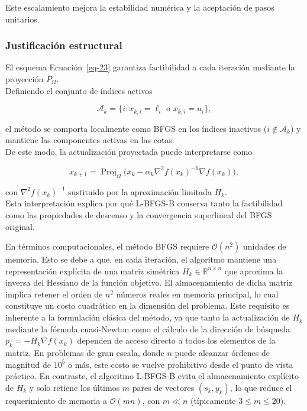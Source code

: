 \documentclass[
  spanish,
  us-letterpaper,
]{scrreprt}
\numberwithin{equation}{section}
\begin{document}
Este escalamiento mejora la estabilidad numérica y la aceptación de
pasos unitarios.

\subsubsection{Justificación
estructural}\label{justificaciuxf3n-estructural}

El esquema Ecuación~\ref{eq-23} garantiza factibilidad a cada iteración
mediante la proyección \(P_\Omega\).\\
Definiendo el conjunto de índices activos

\[
\mathcal{A}_k = \{i : x_{k,i} = \ell_i \text{ o } x_{k,i} = u_i\},
\]

el método se comporta localmente como BFGS en los índices inactivos
(\(i \notin \mathcal{A}_k\)) y mantiene las componentes activas en las
cotas.\\
De este modo, la actualización proyectada puede interpretarse como

\[
x_{k+1} = \operatorname{Proj}_\Omega\big(x_k - \alpha_k \nabla^2 f(x_k)^{-1} \nabla f(x_k)\big),
\]

con \(\nabla^2 f(x_k)^{-1}\) sustituido por la aproximación limitada
\(H_k\).\\
Esta interpretación explica por qué L-BFGS-B conserva tanto la
factibilidad como las propiedades de descenso y la convergencia
superlineal del BFGS original.

En términos computacionales, el método BFGS requiere
\(\mathcal{O}(n^2)\) unidades de memoria. Esto se debe a que, en cada
iteración, el algoritmo mantiene una representación explícita de una
matriz simétrica \(H_k \in \mathbb{R}^{n \times n}\) que aproxima la
inversa del Hessiano de la función objetivo. El almacenamiento de dicha
matriz implica retener el orden de \(n^2\) números reales en memoria
principal, lo cual constituye un costo cuadrático en la dimensión del
problema. Este requisito es inherente a la formulación clásica del
método, ya que tanto la actualización de \(H_k\) mediante la fórmula
cuasi-Newton como el cálculo de la dirección de búsqueda
\(p_k = -H_k \nabla f(x_k)\) dependen de acceso directo a todos los
elementos de la matriz. En problemas de gran escala, donde \(n\) puede
alcanzar órdenes de magnitud de \(10^5\) o más, este costo se vuelve
prohibitivo desde el punto de vista práctico. En contraste, el algoritmo
L-BFGS-B evita el almacenamiento explícito de \(H_k\) y solo retiene los
últimos \(m\) pares de vectores \((s_k, y_k)\), lo que reduce el
requerimiento de memoria a \(\mathcal{O}(mn)\), con \(m \ll n\)
(típicamente \(3 \leq m \leq 20\)).
\end{document}
